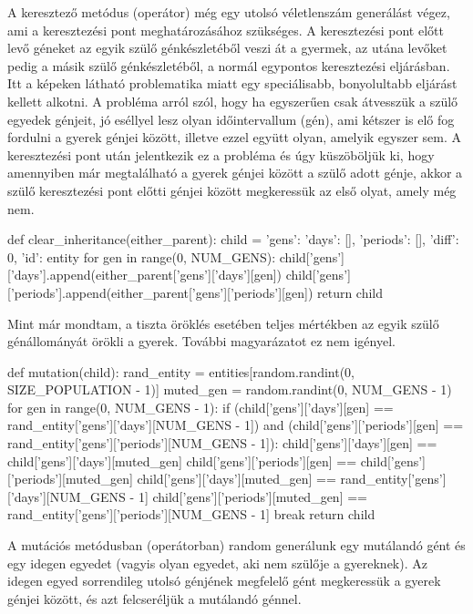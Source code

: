 \documentclass[a4paper,12pt]{article}
\begin{document}
A keresztező metódus (operátor) még egy utolsó véletlenszám generálást végez, ami a keresztezési pont meghatározásához szükséges. A keresztezési pont előtt levő géneket az egyik szülő génkészletéből veszi át a gyermek, az utána levőket pedig a másik szülő génkészletéből, a normál egypontos keresztezési eljárásban. Itt a képeken látható problematika miatt egy speciálisabb, bonyolultabb eljárást kellett alkotni. A probléma arról szól, hogy ha egyszerűen csak átvesszük a szülő egyedek génjeit, jó eséllyel lesz olyan időintervallum (gén), ami kétszer is elő fog fordulni a gyerek génjei között, illetve ezzel együtt olyan, amelyik egyszer sem. A keresztezési pont után jelentkezik ez a probléma és úgy küszöböljük ki, hogy amennyiben már megtalálható a gyerek génjei között a szülő adott génje, akkor a szülő keresztezési pont előtti génjei között megkeressük az első olyat, amely még nem.

\begin{python}
def clear_inheritance(either_parent):
    child = {'gens': {'days': [], 'periods': []}, 'diff': 0, 'id': entity}
    for gen in range(0, NUM_GENS):
        child['gens']['days'].append(either_parent['gens']['days'][gen])
        child['gens']['periods'].append(either_parent['gens']['periods'][gen])
    return child

Mint már mondtam, a tiszta öröklés esetében teljes mértékben az egyik szülő génállományát örökli a gyerek. További magyarázatot ez nem igényel.

def mutation(child):
    rand_entity = entities[random.randint(0, SIZE_POPULATION - 1)]
    muted_gen = random.randint(0, NUM_GENS - 1)
    for gen in range(0, NUM_GENS - 1):
        if (child['gens']['days'][gen] == rand_entity['gens']['days'][NUM_GENS - 1]) and (child['gens']['periods'][gen] == rand_entity['gens']['periods'][NUM_GENS - 1]):
            child['gens']['days'][gen] == child['gens']['days'][muted_gen]
            child['gens']['periods'][gen] == child['gens']['periods'][muted_gen]
            child['gens']['days'][muted_gen] == rand_entity['gens']['days'][NUM_GENS - 1]
            child['gens']['periods'][muted_gen] == rand_entity['gens']['periods'][NUM_GENS - 1]
            break
    return child
\end{python}

A mutációs metódusban (operátorban) random generálunk egy mutálandó gént és egy idegen egyedet (vagyis olyan egyedet, aki nem szülője a gyereknek). Az idegen egyed sorrendileg utolsó génjének megfelelő gént megkeressük a gyerek génjei között, és azt felcseréljük a mutálandó génnel.
\end{document}
